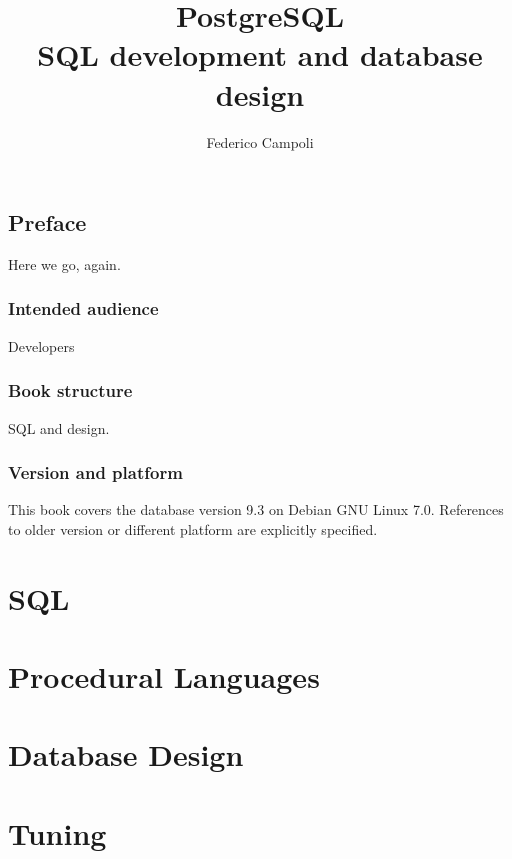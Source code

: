 \documentclass[oneside]{book}
\author{Federico Campoli}
\title{PostgreSQL  \\ SQL development and database design}
\begin{document}
\maketitle

\newpage{}



\tableofcontents{}

\chapter*{Preface}
Here we go, again. 




\section*{Intended audience}
Developers

\section*{Book structure}
SQL and design.\newline


\section*{Version and platform}
This book covers the database version 9.3 on Debian GNU Linux 7.0.
References to older version or different platform are explicitly specified.

\part{SQL}
\part{Procedural Languages}
\part{Database Design}
\part{Tuning}

\appendix

\listoffigures
\listoftables
\printindex{}
\end{document}
